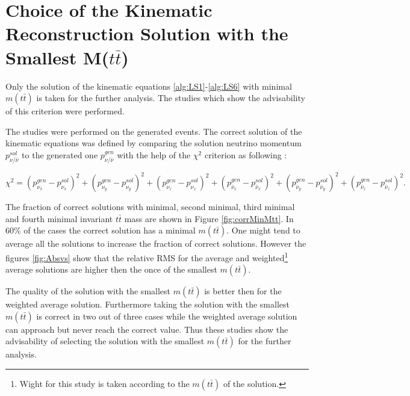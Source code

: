 \chapter{Choice of the Kinematic Reconstruction Solution with the Smallest M($t\bar{t}$)}\label{appendix:mtt}

Only the solution of the kinematic equations \ref{alg:LS1}-\ref{alg:LS6} with minimal $m(t\bar{t})$ is taken for the further analysis.
The studies which show the advisability of this criterion were performed.

The studies were performed on the generated events. The correct solution of the kinematic equations was defined by comparing the 
solution neutrino momentum $p_{\nu/\bar{\nu}}^{sol}$ to the generated one $p_{\nu/\bar{\nu}}^{gen}$ with the help of the $\chi^{2}$ criterion as following \cite{Sonnenschein:2005ed}:

\begin{equation}
 \chi^{2} = (p_{\nu_{x}}^{gen} - p_{\nu_{x}}^{sol})^{2} + (p_{\nu_{y}}^{gen} - p_{\nu_{y}}^{sol})^{2} + (p_{\nu_{z}}^{gen} - p_{\nu_{z}}^{sol})^{2} + (p_{\bar{\nu}_{x}}^{gen} - p_{\bar{\nu}_{x}}^{sol})^{2} +
 (p_{\bar{\nu}_{y}}^{gen} - p_{\bar{\nu}_{y}}^{sol})^{2} + (p_{\bar{\nu}_{z}}^{gen} - p_{\bar{\nu}_{z}}^{sol})^{2}.
\end{equation}

The fraction of correct solutions with minimal, second minimal, third minimal and fourth minimal invariant $t\bar{t}$ mass are shown in Figure \ref{fig:corrMinMtt}. In $60\%$ of 
the cases the correct solution has a minimal $m(t\bar{t})$. One might tend to average all the solutions to increase the fraction of correct solutions. However the figures \ref{fig:Absvs}
show that the relative RMS for the average and weighted\footnote{Wight for this study is taken according to the $m(t\bar{t})$ of the solution.} average solutions are higher then the once
of the smallest $m(t\bar{t})$.

The quality of the solution with the smallest $m(t\bar{t})$ is better then for the weighted average solution. Furthermore taking the solution with the smallest $m(t\bar{t})$ is
correct in two out of three cases while the weighted average solution can approach but never reach the correct value. Thus these studies show the advisability of selecting the
solution with the smallest $m(t\bar{t})$ for the further analysis.

